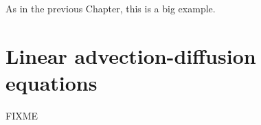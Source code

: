 
As in the previous Chapter, this is a big example.


\section{Linear advection-diffusion equations}

FIXME
